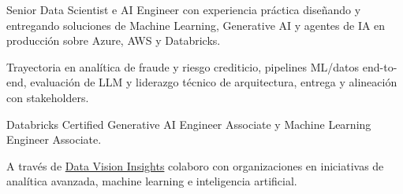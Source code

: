 
{\small\color{cvtext}%
\noindent Senior Data Scientist e AI Engineer con experiencia práctica diseñando y entregando soluciones de Machine Learning, Generative AI y agentes de IA en producción sobre Azure, AWS y Databricks.\par
\vspace{0.14em}%
\noindent Trayectoria en analítica de fraude y riesgo crediticio, pipelines ML/datos end-to-end, evaluación de LLM y liderazgo técnico de arquitectura, entrega y alineación con stakeholders.\par
\vspace{0.14em}%
\noindent Databricks Certified Generative AI Engineer Associate y Machine Learning Engineer Associate.\par
\vspace{0.14em}%
\noindent A través de \href{https://datavisioninsights.com/}{Data Vision Insights} colaboro con organizaciones en iniciativas de analítica avanzada, machine learning e inteligencia artificial.\par
}
